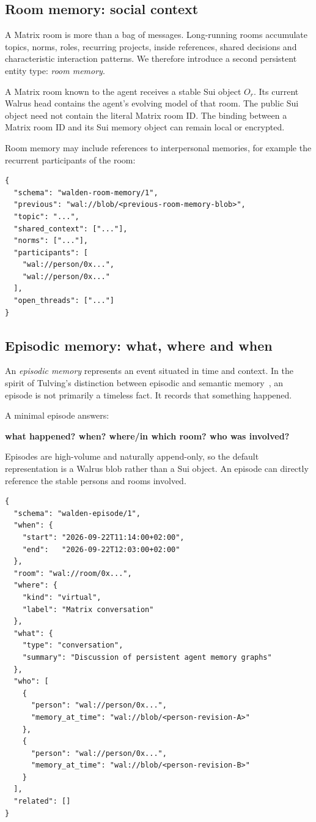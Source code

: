 \documentclass[11pt]{article}
\begin{document}
\subsection{Room memory: social context}

A Matrix room is more than a bag of messages. Long-running rooms accumulate topics, norms, roles, recurring projects, inside references, shared decisions and characteristic interaction patterns. We therefore introduce a second persistent entity type: \emph{room memory}.

A Matrix room known to the agent receives a stable Sui object $O_r$. Its current Walrus head contains the agent's evolving model of that room. The public Sui object need not contain the literal Matrix room ID. The binding between a Matrix room ID and its Sui memory object can remain local or encrypted.

Room memory may include references to interpersonal memories, for example the recurrent participants of the room:

\begin{lstlisting}
{
  "schema": "walden-room-memory/1",
  "previous": "wal://blob/<previous-room-memory-blob>",
  "topic": "...",
  "shared_context": ["..."],
  "norms": ["..."],
  "participants": [
    "wal://person/0x...",
    "wal://person/0x..."
  ],
  "open_threads": ["..."]
}
\end{lstlisting}

\subsection{Episodic memory: what, where and when}

An \emph{episodic memory} represents an event situated in time and context. In the spirit of Tulving's distinction between episodic and semantic memory~\cite{tulving}, an episode is not primarily a timeless fact. It records that something happened.

A minimal episode answers:

\begin{center}
\textbf{what happened? \quad when? \quad where/in which room? \quad who was involved?}
\end{center}

Episodes are high-volume and naturally append-only, so the default representation is a Walrus blob rather than a Sui object. An episode can directly reference the stable persons and rooms involved.

\begin{lstlisting}
{
  "schema": "walden-episode/1",
  "when": {
    "start": "2026-09-22T11:14:00+02:00",
    "end":   "2026-09-22T12:03:00+02:00"
  },
  "room": "wal://room/0x...",
  "where": {
    "kind": "virtual",
    "label": "Matrix conversation"
  },
  "what": {
    "type": "conversation",
    "summary": "Discussion of persistent agent memory graphs"
  },
  "who": [
    {
      "person": "wal://person/0x...",
      "memory_at_time": "wal://blob/<person-revision-A>"
    },
    {
      "person": "wal://person/0x...",
      "memory_at_time": "wal://blob/<person-revision-B>"
    }
  ],
  "related": []
}
\end{lstlisting}
\end{document}
